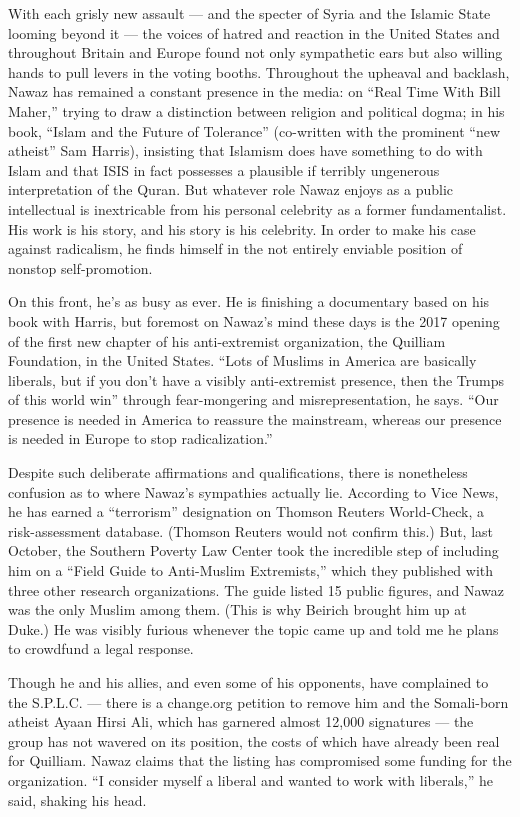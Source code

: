 With each grisly new assault --- and the specter of Syria and the
Islamic State looming beyond it --- the voices of hatred and reaction in
the United States and throughout Britain and Europe found not only
sympathetic ears but also willing hands to pull levers in the voting
booths. Throughout the upheaval and backlash, Nawaz has remained a
constant presence in the media: on ``Real Time With Bill Maher,'' trying
to draw a distinction between religion and political dogma; in his book,
``Islam and the Future of Tolerance'' (co-written with the prominent
``new atheist'' Sam Harris), insisting that Islamism does have something
to do with Islam and that ISIS in fact possesses a plausible if terribly
ungenerous interpretation of the Quran. But whatever role Nawaz enjoys
as a public intellectual is inextricable from his personal celebrity as
a former fundamentalist. His work is his story, and his story is his
celebrity. In order to make his case against radicalism, he finds
himself in the not entirely enviable position of nonstop self-promotion.

On this front, he's as busy as ever. He is finishing a documentary based
on his book with Harris, but foremost on Nawaz's mind these days is the
2017 opening of the first new chapter of his anti-extremist
organization, the Quilliam Foundation, in the United States. ``Lots of
Muslims in America are basically liberals, but if you don't have a
visibly anti-extremist presence, then the Trumps of this world win''
through fear-mongering and misrepresentation, he says. ``Our presence is
needed in America to reassure the mainstream, whereas our presence is
needed in Europe to stop radicalization.''

Despite such deliberate affirmations and qualifications, there is
nonetheless confusion as to where Nawaz's sympathies actually lie.
According to Vice News, he has earned a ``terrorism'' designation on
Thomson Reuters World-Check, a risk-assessment database. (Thomson
Reuters would not confirm this.) But, last October, the Southern Poverty
Law Center took the incredible step of including him on a ``Field Guide
to Anti-Muslim Extremists,'' which they published with three other
research organizations. The guide listed 15 public figures, and Nawaz
was the only Muslim among them. (This is why Beirich brought him up at
Duke.) He was visibly furious whenever the topic came up and told me he
plans to crowdfund a legal response.

Though he and his allies, and even some of his opponents, have
complained to the S.P.L.C. --- there is a change.org petition to remove
him and the Somali-born atheist Ayaan Hirsi Ali, which has garnered
almost 12,000 signatures --- the group has not wavered on its position,
the costs of which have already been real for Quilliam. Nawaz claims
that the listing has compromised some funding for the organization. ``I
consider myself a liberal and wanted to work with liberals,'' he said,
shaking his head.

